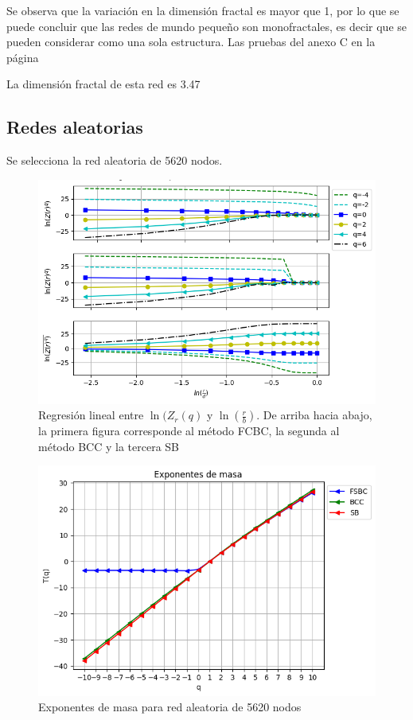 Se observa que la variación en la dimensión fractal es mayor que 1, por lo que se puede concluir que las redes de mundo pequeño son monofractales, es decir que se pueden considerar como una sola estructura. Las pruebas del anexo C en la página \pageref{AnexoC}

La dimensión fractal de esta red es 3.47

\subsection{Redes aleatorias}

Se selecciona la red aleatoria de 5620 nodos.

\begin{figure}[H]
    \centering
    \includegraphics[scale=0.7]{Capitulo4Multifractalidad/imagenes/a_TqLnrBCrandom5620.png}
    \caption{Regresión lineal entre $\ln(Z_r(q)$ y $\ln(\frac{r}{b})$. De arriba hacia abajo, la primera figura corresponde al método FCBC, la segunda al método BCC y la tercera SB}
\end{figure}

\begin{figure}[H]
    \centering
    \includegraphics[scale=0.7]{Capitulo4Multifractalidad/imagenes/a_Tqrandom5620.png}
    \caption{Exponentes de masa para red aleatoria de 5620 nodos}
\end{figure}

